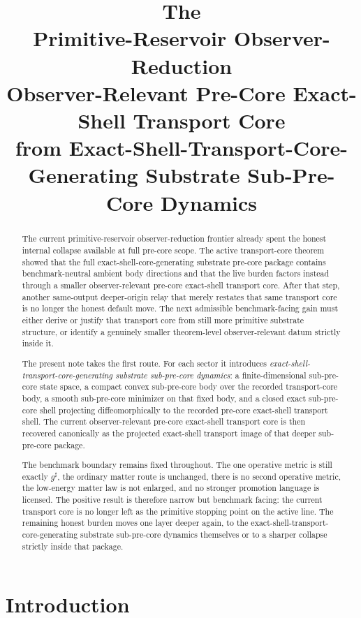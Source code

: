 \documentclass[11pt]{article}
\title{\textbf{The \TheoryName{}}\\[0.4em]
\large Primitive-Reservoir Observer-Reduction\\
\large Observer-Relevant Pre-Core Exact-Shell Transport Core\\
\large from Exact-Shell-Transport-Core-Generating Substrate Sub-Pre-Core Dynamics}
\author{}
\date{}
\newcommand{\CompletedMetric}{g^{\sharp}}
\begin{document}
\maketitle

\begin{abstract}
The current primitive-reservoir observer-reduction frontier already spent the honest internal collapse available at full pre-core scope. The active transport-core theorem showed that the full exact-shell-core-generating substrate pre-core package contains benchmark-neutral ambient body directions and that the live burden factors instead through a smaller observer-relevant pre-core exact-shell transport core. After that step, another same-output deeper-origin relay that merely restates that same transport core is no longer the honest default move. The next admissible benchmark-facing gain must either derive or justify that transport core from still more primitive substrate structure, or identify a genuinely smaller theorem-level observer-relevant datum strictly inside it.

The present note takes the first route. For each sector it introduces \emph{exact-shell-transport-core-generating substrate sub-pre-core dynamics}: a finite-dimensional sub-pre-core state space, a compact convex sub-pre-core body over the recorded transport-core body, a smooth sub-pre-core minimizer on that fixed body, and a closed exact sub-pre-core shell projecting diffeomorphically to the recorded pre-core exact-shell transport shell. The current observer-relevant pre-core exact-shell transport core is then recovered canonically as the projected exact-shell transport image of that deeper sub-pre-core package.

The benchmark boundary remains fixed throughout. The one operative metric is still exactly \(\CompletedMetric\), the ordinary matter route is unchanged, there is no second operative metric, the low-energy matter law is not enlarged, and no stronger promotion language is licensed. The positive result is therefore narrow but benchmark facing: the current transport core is no longer left as the primitive stopping point on the active line. The remaining honest burden moves one layer deeper again, to the exact-shell-transport-core-generating substrate sub-pre-core dynamics themselves or to a sharper collapse strictly inside that package.
\end{abstract}

\section{Introduction}
\end{document}
